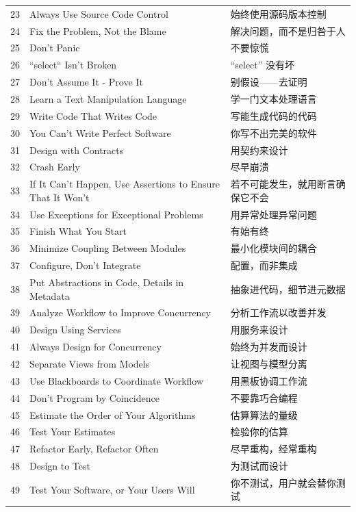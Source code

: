 \begin{longtable}{@{}r p{} p{}@{}}
23 & Always Use Source Code Control & 始终使用源码版本控制 \\
24 & Fix the Problem, Not the Blame & 解决问题，而不是归咎于人 \\
25 & Don't Panic & 不要惊慌 \\
26 & ``select`` Isn't Broken & ``select'' 没有坏 \\
27 & Don't Assume It - Prove It & 别假设——去证明 \\
28 & Learn a Text Manipulation Language & 学一门文本处理语言 \\
29 & Write Code That Writes Code & 写能生成代码的代码 \\
30 & You Can't Write Perfect Software & 你写不出完美的软件 \\
31 & Design with Contracts & 用契约来设计 \\
32 & Crash Early & 尽早崩溃 \\
33 & If It Can't Happen, Use Assertions to Ensure That It Won't & 若不可能发生，就用断言确保它不会 \\
34 & Use Exceptions for Exceptional Problems & 用异常处理异常问题 \\
35 & Finish What You Start & 有始有终 \\
36 & Minimize Coupling Between Modules & 最小化模块间的耦合 \\
37 & Configure, Don't Integrate & 配置，而非集成 \\
38 & Put Abstractions in Code, Details in Metadata & 抽象进代码，细节进元数据 \\
39 & Analyze Workflow to Improve Concurrency & 分析工作流以改善并发 \\
40 & Design Using Services & 用服务来设计 \\
41 & Always Design for Concurrency & 始终为并发而设计 \\
42 & Separate Views from Models & 让视图与模型分离 \\
43 & Use Blackboards to Coordinate Workflow & 用黑板协调工作流 \\
44 & Don't Program by Coincidence & 不要靠巧合编程 \\
45 & Estimate the Order of Your Algorithms & 估算算法的量级 \\
46 & Test Your Estimates & 检验你的估算 \\
47 & Refactor Early, Refactor Often & 尽早重构，经常重构 \\
48 & Design to Test & 为测试而设计 \\
49 & Test Your Software, or Your Users Will & 你不测试，用户就会替你测试 \\

\end{longtable}
